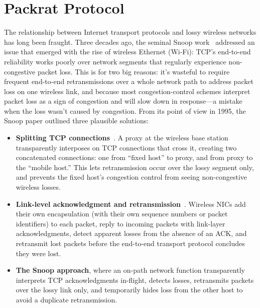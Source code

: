 \chapter{Packrat Protocol}

The relationship between Internet transport protocols and lossy
wireless networks has long been fraught. Three decades ago, the
seminal Snoop work~\cite{balakrishnan1995snoop} addressed an issue
that emerged with the rise of wireless Ethernet (Wi-Fi): TCP's
end-to-end reliability works poorly over network segments that
regularly experience non-congestive packet loss. This is for two big
reasons: it's wasteful to require frequent end-to-end retransmissions
over a whole network path to address packet loss on one wireless link,
and because most congestion-control schemes interpret packet loss as a
sign of congestion and will slow down in response---a mistake when the
loss wasn't caused by congestion. From its point of view in 1995, the
Snoop paper outlined three plausible solutions:
\begin{itemize}[topsep=0pt,itemsep=0pt]
\item \textbf{Splitting TCP connections}~\cite{bakreitcp1994, bb95}. A
  proxy at the wireless base station transparently interposes on TCP
  connections that cross it, creating two concatenated connections:
  one from ``fixed host'' to proxy, and from proxy to the ``mobile
  host.'' This lets retransmission occur over the lossy segment only,
  and prevents the fixed host's congestion control from seeing
  non-congestive wireless losses.

\item \textbf{Link-level acknowledgment and
  retransmission}~\cite{palplus}. Wireless NICs add their own
  encapsulation (with their own sequence numbers or packet
  identifiers) to each packet, reply to incoming packets with
  link-layer acknowledgments, detect apparent losses from the absence
  of an ACK, and retransmit lost packets before the end-to-end
  transport protocol concludes they were lost.

\item \textbf{The Snoop approach}, where an on-path network function
  transparently interprets TCP acknowledgments in-flight, detects
  losses, retransmits packets over the lossy link only, and
  temporarily hides loss from the other host to avoid a duplicate
  retransmission.
\end{itemize}

